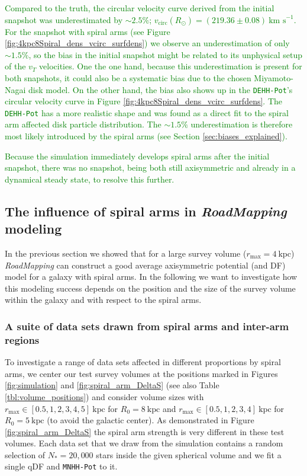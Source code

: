 \documentclass[iop,revtex4,numberedappendix,appendixfloats]{emulateapj}
\newcommand{\RM}{{\sl RoadMapping}}
\newcommand{\NEW}[1]{\textcolor{Green}{#1}}
\begin{document}
\NEW{Compared to the truth, the circular velocity curve derived from the initial snapshot was underestimated by $\sim2.5\%$; $v_\text{circ}(R_\odot)=(219.36 \pm 0.08) ~\text{km s}^{-1}$. For the snapshot with spiral arms (see Figure \ref{fig:4kpc8Spiral_dens_vcirc_surfdens}) we observe an underestimation of only $\sim1.5\%$, so the bias in the initial snapshot might be related to its unphysical setup of the $v_T$ velocities. One the one hand, because this underestimation is present for both snapshots, it could also be a systematic bias due to the chosen Miyamoto-Nagai disk model. On the other hand, the bias also shows up in the \texttt{DEHH-Pot}'s circular velocity curve in Figure \ref{fig:4kpc8Spiral_dens_vcirc_surfdens}. The \texttt{DEHH-Pot} has a more realistic shape and was found as a direct fit to the spiral arm affected disk particle distribution. The $\sim1.5\%$ underestimation is therefore most likely introduced by the spiral arms (see Section \ref{sec:biases_explained}).}

\NEW{Because the simulation immediately develops spiral arms after the initial snapshot, there was no snapshot, being both still axisymmetric and already in a dynamical steady state, to resolve this further.}

\subsection{The influence of spiral arms in \RM{} modeling} \label{sec:results_part2}

In the previous section we showed that for a large survey volume ($r_\text{max}=4~\text{kpc}$) \RM{} can construct a good average axisymmetric potential (and DF) model for a galaxy with spiral arms. In the following we want to investigate how this modeling success depends on the position and the size of the survey volume within the galaxy and with respect to the spiral arms.


\subsubsection{A suite of data sets drawn from spiral arms and inter-arm regions} \label{sec:suite}

To investigate a range of data sets affected in different proportions by spiral arms, we center our test survey volumes at the positions marked in Figures \ref{fig:simulation} and \ref{fig:spiral_arm_DeltaS} (see also Table \ref{tbl:volume_positions}) and consider volume sizes with $r_\text{max} \in [0.5,1,2,3,4,5]~\text{kpc}$ for $R_0 = 8~\text{kpc}$ and $r_\text{max} \in [0.5,1,2,3,4]~\text{kpc}$ for $R_0 = 5~\text{kpc}$ (to avoid the galactic center). As demonstrated in Figure \ref{fig:spiral_arm_DeltaS} the spiral arm strength is very different in these test volumes. Each data set that we draw from the simulation contains a random selection of $N_*=20,000$ stars inside the given spherical volume and we fit a single qDF and \texttt{MNHH-Pot} to it. 
\end{document}
